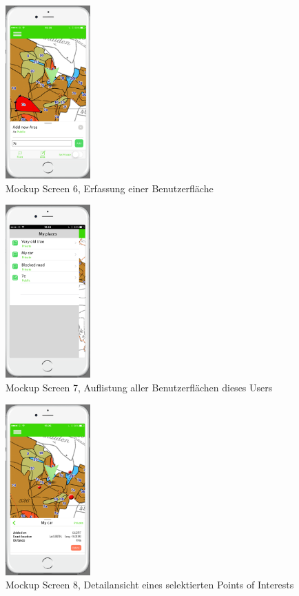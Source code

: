 \begin{figure}[H]
\centering
    \includegraphics[width=0.29\textwidth]{mockup1-6}
    \caption{Mockup Screen 6, Erfassung einer Benutzerfl\"ache}
    \label{fig:mesh6}
\end{figure}

\begin{figure}[H]
\centering
    \includegraphics[width=0.29\textwidth]{mockup1-7}
    \caption{Mockup Screen 7, Auflistung aller Benutzerfl\"achen dieses Users}
    \label{fig:mesh7}
\end{figure}

\begin{figure}[H]
\centering
    \includegraphics[width=0.29\textwidth]{mockup1-8}
    \caption{Mockup Screen 8, Detailansicht eines selektierten Points of Interests}
    \label{fig:mesh8}
\end{figure}

